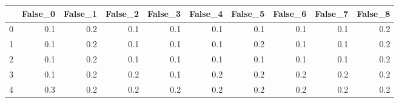\begin{tabular}{lrrrrrrrrr}
\toprule
{} &  False\_0 &  False\_1 &  False\_2 &  False\_3 &  False\_4 &  False\_5 &  False\_6 &  False\_7 &  False\_8 \\ \hline
\midrule
0 &      0.1 &      0.2 &      0.1 &      0.1 &      0.1 &      0.1 &      0.1 &      0.1 &      0.2 \\ \hline
1 &      0.1 &      0.2 &      0.1 &      0.1 &      0.1 &      0.2 &      0.1 &      0.1 &      0.2 \\ \hline
2 &      0.1 &      0.2 &      0.1 &      0.1 &      0.1 &      0.1 &      0.1 &      0.1 &      0.2 \\ \hline
3 &      0.1 &      0.2 &      0.2 &      0.1 &      0.2 &      0.2 &      0.2 &      0.2 &      0.2 \\ \hline
4 &      0.3 &      0.2 &      0.2 &      0.2 &      0.2 &      0.2 &      0.2 &      0.2 &      0.2 \\ \hline
\bottomrule
\end{tabular}

